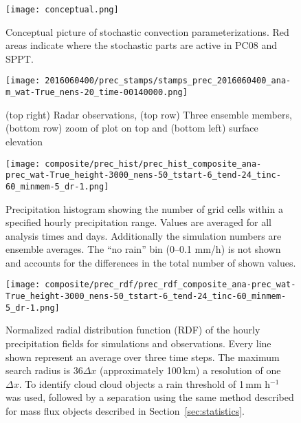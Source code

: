 \documentclass[a4paper, 12pt]{article}
\begin{document}
\begin{figure}[h!]
\noindent \centering
\texttt{[image: conceptual.png]}\\
\caption{Conceptual picture of stochastic convection parameterizations. Red areas indicate where the stochastic parts are active in PC08 and SPPT.} \label{fig:conceptual}
\end{figure}

\begin{figure}[h!]
\noindent \centering
\texttt{[image: 2016060400/prec\_stamps/stamps\_prec\_2016060400\_ana-m\_wat-True\_nens-20\_time-00140000.png]}\\
\caption{(top right) Radar observations, (top row) Three ensemble members, (bottom row) zoom of plot on top and (bottom left) surface elevation} \label{fig:prec_stamps}
\end{figure}

\begin{figure}[h!]
\noindent \centering
\texttt{[image: composite/prec\_hist/prec\_hist\_composite\_ana-prec\_wat-True\_height-3000\_nens-50\_tstart-6\_tend-24\_tinc-60\_minmem-5\_dr-1.png]}\\
\caption{Precipitation histogram showing the number of grid cells within a specified hourly precipitation range. Values are averaged for all analysis times and days. Additionally the simulation numbers are ensemble averages. The ``no rain'' bin (0--0.1 mm/h) is not shown and accounts for the differences in the total number of shown values.} \label{fig:prec_hist}
\end{figure}

\begin{figure}[h!]
\noindent \centering
\texttt{[image: composite/prec\_rdf/prec\_rdf\_composite\_ana-prec\_wat-True\_height-3000\_nens-50\_tstart-6\_tend-24\_tinc-60\_minmem-5\_dr-1.png]}\\
\caption{Normalized radial distribution function (RDF) of the hourly precipitation fields for simulations and observations. Every line shown represent an average over three time steps. The maximum search radius is 36$\Delta x$ (approximately 100\,km) a resolution of one $\Delta x$. To identify cloud cloud objects a rain threshold of 1\,mm h$^{-1}$ was used, followed by a separation using the same method described for mass flux objects described in Section~\ref{sec:statistics}.} \label{fig:prec_rdf}
\end{figure}
\end{document}
